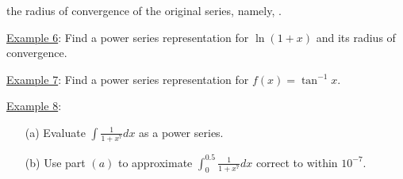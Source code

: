 \documentclass[paper=a4, fontsize=11pt]{scrartcl} %
\numberwithin{equation}{section} %
\numberwithin{figure}{section} %
\numberwithin{table}{section} %
\newcommand{\ds}{\displaystyle}
\begin{document}
   the radius of convergence of the original series, namely, \underline{\hspace{1in}}.
  
  \newpage
  
  \underline{Example 6}: Find a power series representation for $\ln (1+x)$ and its radius of convergence.\\
  \indent
  
  \vspace{4in}
  
  \underline{Example 7}: Find a power series representation for $f(x)=\tan^{-1}x$.\\
  \indent
  
  \vspace{3in}
  
  \newpage
  
  \underline{Example 8}:
  \begin{enumerate}
  \item[(a)] Evaluate $\ds\int \ds\frac{1}{1+x^7} dx$ as a power series.
  \item[(b)] Use part $(a)$ to approximate $\ds\int_0^{0.5} \ds\frac{1}{1+x^7} dx$ correct to within $10^{-7}$.
  \end{enumerate}
  \indent\\
  \indent

\end{document}
